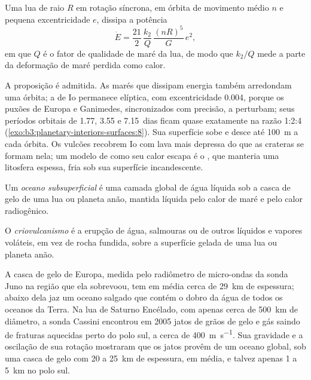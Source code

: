 \begin{proposition}\label{prop:b3:planetary-interiors-surfaces:tidal-power}
Uma lua de raio $R$ em rotação síncrona, em órbita de movimento médio
$n$ e pequena excentricidade $e$, dissipa a potência
\[
  \dot E = \frac{21}{2}\,\frac{k_2}{Q}\,\frac{(nR)^5}{G}\,e^2 ,
\]
em que $Q$ é o fator de qualidade de maré da lua, de modo que $k_2/Q$ mede a
parte da deformação de maré perdida como calor.
\end{proposition}

A proposição é admitida. As marés que dissipam energia também arredondam
uma órbita; a de Io permanece elíptica, com excentricidade 0.004, porque os puxões
de Europa e Ganimedes, sincronizados com precisão, a perturbam; seus períodos orbitais de
1.77, 3.55 e \num{7.15}~dias ficam quase exatamente na razão
1:2:4 (\cref{exo:b3:planetary-interiors-surfaces:8}). Sua superfície sobe
e desce até \qty{100}{m} a cada órbita. Os vulcões recobrem Io com lava
mais depressa do que as crateras se formam nela; um modelo
de como seu calor escapa é o , que manteria uma litosfera espessa,
fria sob sua superfície incandescente.

\begin{definition}\label{def:b3:planetary-interiors-surfaces:ocean-world}
Um \emph{oceano subsuperficial} é uma camada global de
água líquida sob a casca de gelo de uma lua ou planeta anão, mantida líquida
pelo calor de maré e pelo calor radiogênico.
\end{definition}

\begin{definition}[Criovulcanismo]\label{def:b3:planetary-interiors-surfaces:cryovolcanism}
O \emph{criovulcanismo} é a erupção de água, salmouras
ou de outros líquidos e vapores voláteis, em vez de rocha fundida, sobre a
superfície gelada de uma lua ou planeta anão.
\end{definition}

A casca de gelo de Europa, medida pelo radiômetro de micro-ondas da sonda Juno
na região que ela sobrevoou, tem em média cerca de \qty{29}{km} de espessura;
abaixo dela jaz um oceano salgado que contém o dobro da água de todos os
oceanos da Terra. Na lua de Saturno Encélado, com apenas cerca de \qty{500}{km}
de diâmetro, a sonda Cassini encontrou em 2005 jatos de grãos de gelo e gás
saindo de fraturas aquecidas perto do polo sul, a cerca de
\qty{400}{m.s^{-1}}. Sua gravidade e a oscilação de sua rotação mostraram que os
jatos provêm de um oceano global, sob uma casca de gelo com 20 a
\qty{25}{km} de espessura, em média, e talvez apenas 1 a \qty{5}{km}
no polo sul.


